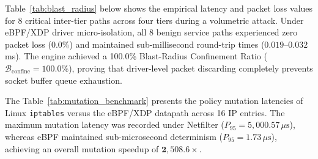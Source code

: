 \documentclass[conference]{IEEEtran}
\begin{document}
Table~\ref{tab:blast_radius} below shows the empirical latency and packet loss values for 8 critical inter-tier paths across four tiers during a volumetric attack. Under eBPF/XDP driver micro-isolation, all 8 benign service paths experienced zero packet loss (0.0\%) and maintained sub-millisecond round-trip times ($0.019\text{--}0.032$\,ms). The engine achieved a 100.0\% Blast-Radius Confinement Ratio ($\mathcal{B}_{\text{confine}} = 100.0\%$), proving that driver-level packet discarding completely prevents socket buffer queue exhaustion.

\begin{table}[htbp]
\centering
\caption{POLICY MUTATION LATENCY BENCHMARK}
\label{tab:mutation_benchmark}
\setlength{\tabcolsep}{4pt}
\end{table}

The Table~\ref{tab:mutation_benchmark} presents the policy mutation latencies of Linux \texttt{iptables} versus the eBPF/XDP datapath across 16 IP entries. The maximum mutation latency was recorded under Netfilter ($P_{95} = 5,000.57\,\mu\text{s}$), whereas eBPF maintained sub-microsecond determinism ($P_{95} = 1.73\,\mu\text{s}$), achieving an overall mutation speedup of $\mathbf{2,508.6\times}$.

\begin{table}[htbp]
\centering
\caption{ANTI-FLAPPING HYSTERESIS DYNAMICS}
\label{tab:hysteresis_table}
\setlength{\tabcolsep}{4pt}
\end{table}
\end{document}
